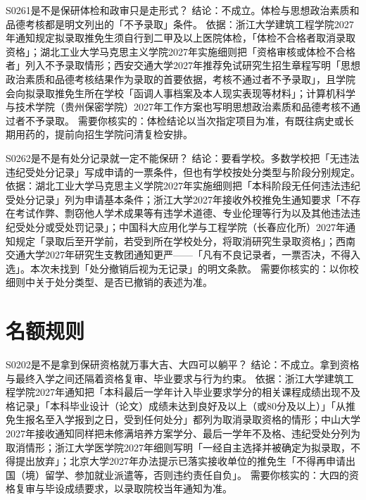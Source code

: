 \begin{qa}{S0261}{是不是保研体检和政审只是走形式？}
结论：不成立。体检与思想政治素质和品德考核都是明文列出的「不予录取」条件。
依据：浙江大学建筑工程学院2027年通知规定拟录取推免生须自行到二甲及以上医院体检，「体检不合格者取消录取资格」；湖北工业大学马克思主义学院2027年实施细则把「资格审核或体检不合格者」列入不予录取情形；西安交通大学2027年推荐免试研究生招生章程写明「思想政治素质和品德考核结果作为录取的首要依据，考核不通过者不予录取」，且学院会向拟录取推免生所在学校「函调人事档案及本人现实表现等材料」；计算机科学与技术学院（贵州保密学院）2027年工作方案也写明思想政治素质和品德考核不通过者不予录取。
需要你核实的：体检结论以当次指定项目为准，有既往病史或长期用药的，提前向招生学院问清复检安排。
\end{qa}

\begin{qa}{S0262}{是不是有处分记录就一定不能保研？}
结论：要看学校。多数学校把「无违法违纪受处分记录」写成申请的一票条件，但也有学校按处分类型与阶段分别规定。
依据：湖北工业大学马克思主义学院2027年实施细则把「本科阶段无任何违法违纪受处分记录」列为申请基本条件；浙江大学2027年接收外校推免生通知要求「不存在考试作弊、剽窃他人学术成果等有违学术道德、专业伦理等行为以及其他违法违纪受处分或受处罚记录」；中国科大应用化学与工程学院（长春应化所）2027年通知规定「录取后至开学前，若受到所在学校处分，将取消研究生录取资格」；西南交通大学2027年研究生支教团通知更严——「凡有不良记录者，一票否决，不得入选」。本次未找到「处分撤销后视为无记录」的明文条款。
需要你核实的：以你校细则中关于处分类型、是否已撤销的表述为准。
\end{qa}

\section{名额规则}
\begin{qa}{S0202}{是不是拿到保研资格就万事大吉、大四可以躺平？}
结论：不成立。拿到资格与最终入学之间还隔着资格复审、毕业要求与行为约束。
依据：浙江大学建筑工程学院2027年通知把「本科最后一学年计入毕业要求学分的相关课程成绩出现不及格记录」「本科毕业设计（论文）成绩未达到良好及以上（或80分及以上）」「从推免生报名至入学报到之日，受到任何处分」都列为取消录取资格的情形；中山大学2027年接收通知同样把未修满培养方案学分、最后一学年不及格、违纪受处分列为取消情形；浙江大学医学院2027年细则写明「一经自主选择并被确定为拟录取，不得提出放弃」；北京大学2027年办法提示已落实接收单位的推免生「不得再申请出国（境）留学、参加就业派遣等，否则违约责任自负」。
需要你核实的：大四的资格复审与毕设成绩要求，以录取院校当年通知为准。
\end{qa}

